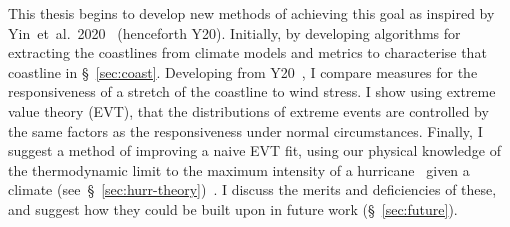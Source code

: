 

This thesis begins to develop new methods of achieving this goal
as inspired by Yin~et~al.~2020~\cite{ZannaPreprint} (henceforth Y20).
Initially, by developing algorithms for extracting the coastlines from climate models
and metrics to characterise that coastline in §~\ref{sec:coast}.
Developing from Y20~\cite{ZannaPreprint}, I compare measures for the
responsiveness of a stretch of the coastline to wind stress.
I show using extreme value theory (EVT), that the
distributions of extreme events are controlled by the same factors as
the responsiveness under normal circumstances.
Finally, I suggest a
method of improving a naive EVT fit, using our physical knowledge
of the thermodynamic limit
to the maximum intensity of a hurricane~\cite{emanuel1999thermodynamic}
 given a climate (see~§~\ref{sec:hurr-theory})~\cite{emanuel1987dependence,
 emanuel2016predictability}.
I discuss the merits and deficiencies of these,
and suggest how they could be built upon in future work (§~\ref{sec:future}).
